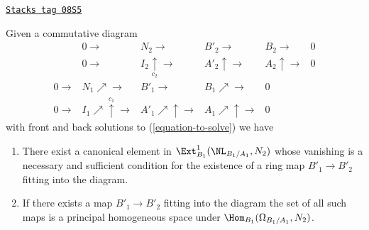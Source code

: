 \begin{lemma}
\label{defos-lemma-huge-diagram}
\href{https://stacks.math.columbia.edu/tag/08S5}{\texttt{Stacks tag 08S5}}

Given a commutative diagram
$$
\begin{array}{cccccc} & 0 \longrightarrow & N_2 \longrightarrow & B'_2 \longrightarrow & B_2 \longrightarrow & 0 \\  & 0 \longrightarrow & I_2 \underset{c_2}{\uparrow}\longrightarrow & A'_2 \uparrow\longrightarrow & A_2 \uparrow\longrightarrow & 0 \\ 0 \longrightarrow & N_1 \nearrow\longrightarrow & B'_1 \longrightarrow & B_1 \nearrow\longrightarrow & 0 &  \\ 0 \longrightarrow & I_1 \nearrow\overset{c_1}{\uparrow}\longrightarrow & A'_1 \nearrow\uparrow\longrightarrow & A_1 \nearrow\uparrow\longrightarrow & 0 & \end{array}
$$
with front and back solutions to (\ref{equation-to-solve}) we have
\begin{enumerate}
\item There exist a canonical element in
$\Ext^1_{B_1}(\NL_{B_1/A_1}, N_2)$
whose vanishing is a necessary and sufficient condition for the existence
of a ring map $B'_1 \to B'_2$ fitting into the diagram.
\item If there exists a map $B'_1 \to B'_2$ fitting into the diagram
the set of all such maps is a principal homogeneous space under
$\Hom_{B_1}(\Omega_{B_1/A_1}, N_2)$.
\end{enumerate}
\end{lemma}

